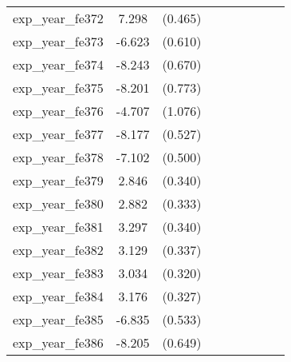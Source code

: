 {\begin{tabular}{l*{4}{cc}}
exp\_year\_fe372&    7.298\sym{***}&  (0.465)&                  &         &                  &         &                  &         \\
exp\_year\_fe373&   -6.623\sym{***}&  (0.610)&                  &         &                  &         &                  &         \\
exp\_year\_fe374&   -8.243\sym{***}&  (0.670)&                  &         &                  &         &                  &         \\
exp\_year\_fe375&   -8.201\sym{***}&  (0.773)&                  &         &                  &         &                  &         \\
exp\_year\_fe376&   -4.707\sym{***}&  (1.076)&                  &         &                  &         &                  &         \\
exp\_year\_fe377&   -8.177\sym{***}&  (0.527)&                  &         &                  &         &                  &         \\
exp\_year\_fe378&   -7.102\sym{***}&  (0.500)&                  &         &                  &         &                  &         \\
exp\_year\_fe379&    2.846\sym{***}&  (0.340)&                  &         &                  &         &                  &         \\
exp\_year\_fe380&    2.882\sym{***}&  (0.333)&                  &         &                  &         &                  &         \\
exp\_year\_fe381&    3.297\sym{***}&  (0.340)&                  &         &                  &         &                  &         \\
exp\_year\_fe382&    3.129\sym{***}&  (0.337)&                  &         &                  &         &                  &         \\
exp\_year\_fe383&    3.034\sym{***}&  (0.320)&                  &         &                  &         &                  &         \\
exp\_year\_fe384&    3.176\sym{***}&  (0.327)&                  &         &                  &         &                  &         \\
exp\_year\_fe385&   -6.835\sym{***}&  (0.533)&                  &         &                  &         &                  &         \\
exp\_year\_fe386&   -8.205\sym{***}&  (0.649)&                  &         &                  &         &                  &         \\

\end{tabular}}
